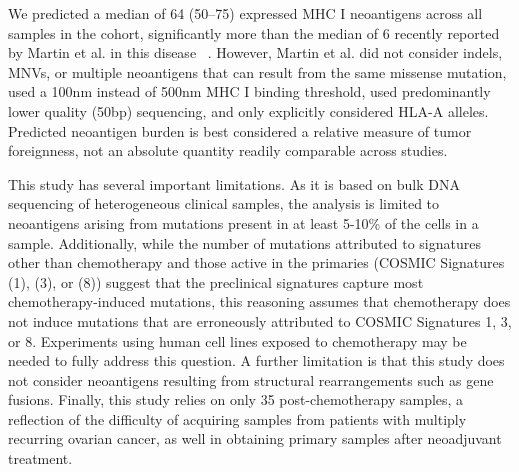 We predicted a median of 64 (50--75) expressed MHC I neoantigens across all samples in the cohort, significantly more than the median of 6 recently reported by Martin et al. in this disease ~\cite{Martin_2016}. However, Martin et al. did not consider indels, MNVs, or multiple neoantigens that can result from the same missense mutation, used a 100nm instead of 500nm MHC I binding threshold, used predominantly lower quality (50bp) sequencing, and only explicitly considered HLA-A alleles. Predicted neoantigen burden is best considered a relative measure of tumor foreignness, not an absolute quantity readily comparable across studies.

This study has several important limitations. As it is based on bulk DNA sequencing of heterogeneous clinical samples, the analysis is limited to neoantigens arising from mutations present in at least 5-10\% of the cells in a sample. Additionally, while the number of mutations attributed to signatures other than chemotherapy and those active in the primaries (COSMIC Signatures (1), (3), or (8)) suggest that the preclinical signatures capture most chemotherapy-induced mutations, this reasoning assumes that chemotherapy does not induce mutations that are erroneously attributed to COSMIC Signatures 1, 3, or 8. Experiments using human cell lines exposed to chemotherapy may be needed to fully address this question. A further limitation is that this study does not consider neoantigens resulting from structural rearrangements such as gene fusions. Finally, this study relies on only 35 post-chemotherapy samples, a reflection of the difficulty of acquiring samples from patients with multiply recurring ovarian cancer, as well in obtaining primary samples after neoadjuvant treatment.